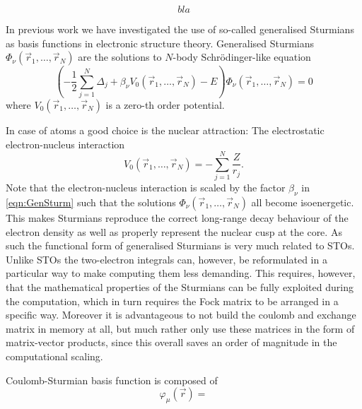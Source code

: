 \begin{equation}
	bla
	\label{eqn:CSEquation}
\end{equation}



In previous work we have investigated the use of so-called generalised Sturmians as basis functions
in electronic structure theory.
%
\newcommand{\rpack}{\vec{r}_1, \ldots, \vec{r}_N}
Generalised Sturmians $\Phi_\nu(\rpack)$ are the solutions to $N$-body Schrödinger-like equation
\begin{equation}
	\left( -\frac12 \sum_{j=1}^N \Delta_j + \beta_\nu V_0(\rpack) - E \right) \Phi_\nu(\rpack) = 0
	\label{eqn:GenSturm}
\end{equation}
where $V_0(\rpack)$ is
a zero-th order potential.

In case of atoms a good choice is the nuclear attraction:
The electrostatic electron-nucleus interaction
\[
	V_0(\rpack) = - \sum_{j=1}^N \frac{Z}{r_j}.
\]
Note that the electron-nucleus interaction is scaled by the factor $\beta_\nu$ in \eqref{eqn:GenSturm}
such that the solutions $\Phi_\nu(\rpack)$ all become isoenergetic.
This makes Sturmians reproduce the correct long-range decay behaviour of the electron density
as well as properly represent the nuclear cusp at the core.
As such the functional form of generalised Sturmians is very much related to STOs.
Unlike STOs the two-electron integrals can, however, be reformulated in a particular way
to make computing them less demanding.
This requires, however, that the mathematical properties of the Sturmians
can be fully exploited during the computation,
which in turn requires the Fock matrix to be arranged in a specific way.
Moreover it is advantageous to not build the coulomb and exchange matrix in memory at all,
but much rather only use these matrices in the form of matrix-vector products,
since this overall saves an order of magnitude in the computational scaling.


Coulomb-Sturmian basis function is composed of
\[ \varphi_\mu(\vec{r}) = \]



